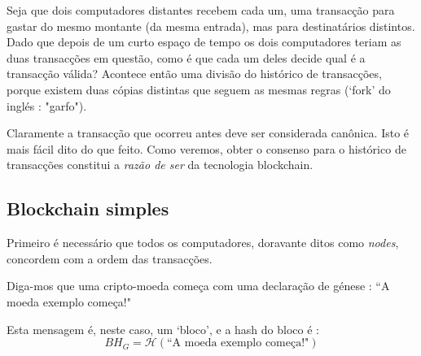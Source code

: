
Seja que dois computadores distantes recebem cada um, uma transacção para gastar do mesmo montante (da mesma entrada), mas para destinatários distintos. Dado que depois de um curto espaço de tempo os dois computadores teriam as duas transacções em questão, como é que cada um deles decide qual é a transacção válida? Acontece então uma divisão do histórico de transacções, porque existem duas cópias distintas que seguem as mesmas regras (`fork' do inglés : "garfo"). 


Claramente a transacção que ocorreu antes deve ser considerada canônica. Isto é mais fácil dito do que feito. Como veremos, obter o consenso para o histórico de transacções constitui a {\em razão de ser} da tecnologia blockchain. 



\subsection{Blockchain simples}
\label{subsec:simple-blockchain}


Primeiro é necessário que todos os computadores, doravante ditos como {\em nodes}, concordem com a ordem das transacções. 


Diga-mos que uma cripto-moeda começa com uma declaração de génese : 
``A moeda exemplo começa!"

Esta mensagem é, neste caso, um `bloco', e a hash do bloco é :
\vspace{.175cm}
\[\mathit{BH}_G = \mathcal{H}(\textrm{``A moeda exemplo começa!"})\]


